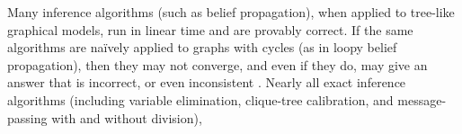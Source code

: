 Many inference algorithms (such as belief propagation),
when applied to tree-like graphical models,
run in linear time and are provably correct.
If the same algorithms are na{\"i}vely applied to graphs with cycles (as in loopy belief propagation),
then they may not converge, and even if they do,
may give an answer that is incorrect, or even inconsistent \parencite{wainwright2008graphical}.
Nearly all exact inference algorithms
(including variable elimination, clique-tree calibration, and message-passing with and without division),

